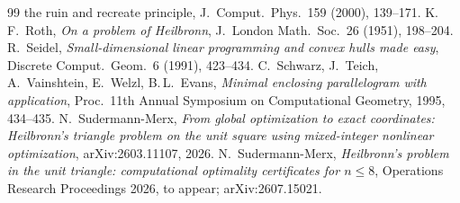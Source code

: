 \documentclass[11pt]{article}
\theoremstyle{remark}
\begin{document}
\begin{thebibliography}{99}
{  the ruin and recreate principle}, J.\ Comput.\ Phys.\ 159 (2000), 139--171.
 K.\,F.~Roth, \emph{On a problem of Heilbronn}, J.\ London Math.\ Soc.\ 26 (1951), 198--204.
 R.~Seidel, \emph{Small-dimensional linear programming and convex hulls made easy}, Discrete
  Comput.\ Geom.\ 6 (1991), 423--434.
 C.~Schwarz, J.~Teich, A.~Vainshtein, E.~Welzl, B.\,L.~Evans, \emph{Minimal enclosing parallelogram
  with application}, Proc.\ 11th Annual Symposium on Computational Geometry, 1995, 434--435.
 N.~Sudermann-Merx, \emph{From global optimization to exact coordinates: Heilbronn's triangle problem on
  the unit square using mixed-integer nonlinear optimization}, arXiv:2603.11107, 2026.
 N.~Sudermann-Merx, \emph{Heilbronn's problem in the unit triangle: computational optimality
  certificates for $n \le 8$}, Operations Research Proceedings 2026, to appear; arXiv:2607.15021.
\end{thebibliography}
\end{document}
